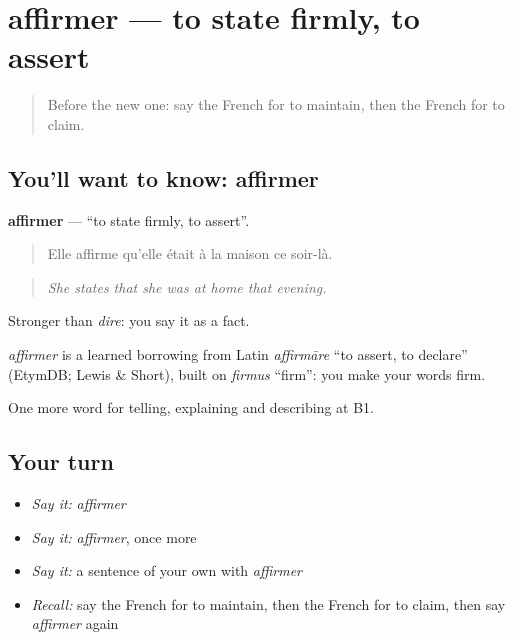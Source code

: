 \section[affirmer]{affirmer — to state firmly, to assert}

\label{lesson:FR-C334-affirmer}



\begin{quote}
Before the new one: say the French for to maintain, then the French for to claim.
\end{quote}

\subsection*{You'll want to know: affirmer}
\textbf{affirmer} — \textquotedblleft{}to state firmly, to assert\textquotedblright{}.

\begin{quote}
Elle affirme qu'elle était à la maison ce soir-là.
\end{quote}

\begin{quote}
\emph{She states that she was at home that evening.}
\end{quote}

Stronger than \emph{dire}: you say it as a fact.

\begin{cousinweb}
\emph{affirmer} is a learned borrowing from Latin \emph{affirmāre} \textquotedblleft{}to assert, to declare\textquotedblright{} (EtymDB; Lewis \& Short), built on \emph{firmus} \textquotedblleft{}firm\textquotedblright{}: you make your words firm.
\end{cousinweb}

\begin{grammarlens}[title={What you've built}]
One more word for telling, explaining and describing at B1.
\end{grammarlens}

\subsection*{Your turn}
\begin{itemize}
\raggedright
  \item \emph{Say it:} \emph{affirmer}
  \item \emph{Say it:} \emph{affirmer}, once more
  \item \emph{Say it:} a sentence of your own with \emph{affirmer}
  \item \emph{Recall:} say the French for to maintain, then the French for to claim, then say \emph{affirmer} again
\end{itemize}


